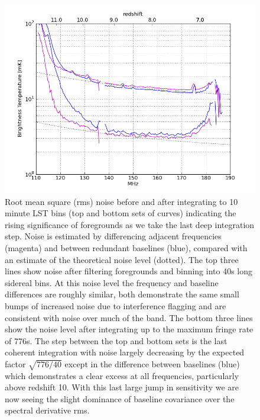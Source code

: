\documentclass[preprint]{aastex}
\begin{document}
\begin{figure}
\centering
\includegraphics[width=\textwidth]{figures/psa32_trms_with_and_without_fr_filtering_z.png}
\caption{\label{fig:noise} Root mean square (rms) noise before and after integrating to 10 minute LST bins (top and bottom sets of curves) indicating the rising significance of foregrounds as we take the last deep integration step. Noise is estimated by differencing adjacent frequencies (magenta) and between redundant baselines (blue), compared with an estimate of the theoretical noise level (dotted). The top three lines show noise after filtering foregrounds and binning into 40s long sidereal bins.  At this noise level the frequency and baseline differences are roughly similar, both demonstrate the same small bumps of increased noise due to interference flagging and are consistent with noise over much of the band.  The bottom three lines show the noise level after integrating up to the maximum fringe rate of 776s. The step between the top and bottom sets is the last coherent integration with noise largely decreasing by the expected factor $\sqrt{776/40}$ except in the difference between baselines (blue) which demonstrates a clear excess at all frequencies, particularly above redshift 10. With this last large jump in sensitivity we are now seeing the slight dominance of baseline covariance over the spectral derivative rms. }
\end{figure}
\end{document}
